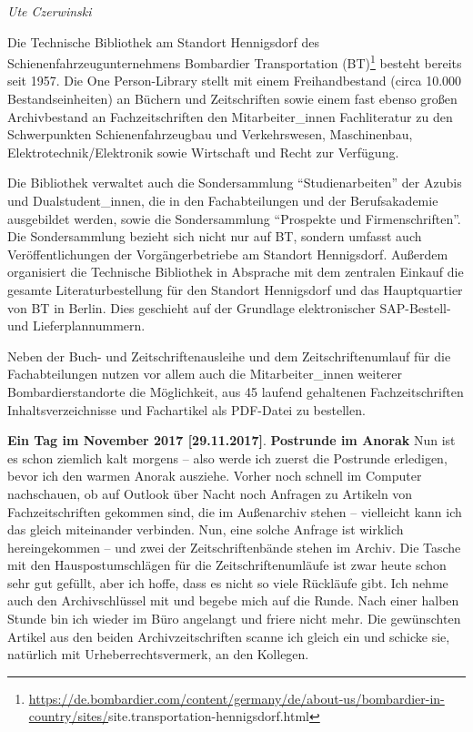 \documentclass[a4paper,
fontsize=11pt,
oneside,
numbers=noperiodatend,
parskip=half-,
bibliography=totoc,
final
]{scrartcl}
\begin{document}
\textit{Ute Czerwinski}

Die Technische Bibliothek am Standort Hennigsdorf des
Schienenfahrzeugunternehmens Bombardier Transportation (BT)\footnote{\url{https://de.bombardier.com/content/germany/de/about-us/bombardier-in-country/sites/}site.transportation-hennigsdorf.html}
besteht bereits seit 1957. Die One Person-Library stellt mit einem
Freihandbestand (circa 10.000 Bestandseinheiten) an Büchern und
Zeitschriften sowie einem fast ebenso großen Archivbestand an
Fachzeitschriften den Mitarbeiter\_innen Fachliteratur zu den
Schwerpunkten Schienenfahrzeugbau und Verkehrswesen, Maschinenbau,
Elektrotechnik/Elektronik sowie Wirtschaft und Recht zur Verfügung.

Die Bibliothek verwaltet auch die Sondersammlung
\enquote{Studienarbeiten} der Azubis und Dualstudent\_innen, die in den
Fachabteilungen und der Berufsakademie ausgebildet werden, sowie die
Sondersammlung \enquote{Prospekte und Firmenschriften}. Die
Sondersammlung bezieht sich nicht nur auf BT, sondern umfasst auch
Veröffentlichungen der Vorgängerbetriebe am Standort Hennigsdorf.
Außerdem organisiert die Technische Bibliothek in Absprache mit dem
zentralen Einkauf die gesamte Literaturbestellung für den Standort
Hennigsdorf und das Hauptquartier von BT in Berlin. Dies geschieht auf
der Grundlage elektronischer SAP-Bestell- und Lieferplannummern.

Neben der Buch- und Zeitschriftenausleihe und dem Zeitschriftenumlauf
für die Fachabteilungen nutzen vor allem auch die Mitarbeiter\_innen
weiterer Bombardierstandorte die Möglichkeit, aus 45 laufend gehaltenen
Fachzeitschriften Inhaltsverzeichnisse und Fachartikel als PDF-Datei zu
bestellen.

\textbf{Ein Tag im November 2017 {[}29.11.2017{]}}. \textbf{Postrunde im
Anorak} Nun ist es schon ziemlich kalt morgens -- also werde ich zuerst
die Postrunde erledigen, bevor ich den warmen Anorak ausziehe. Vorher
noch schnell im Computer nachschauen, ob auf Outlook über Nacht noch
Anfragen zu Artikeln von Fachzeitschriften gekommen sind, die im
Außenarchiv stehen -- vielleicht kann ich das gleich miteinander
verbinden. Nun, eine solche Anfrage ist wirklich hereingekommen -- und
zwei der Zeitschriftenbände stehen im Archiv. Die Tasche mit den
Hauspostumschlägen für die Zeitschriftenumläufe ist zwar heute schon
sehr gut gefüllt, aber ich hoffe, dass es nicht so viele Rückläufe gibt.
Ich nehme auch den Archivschlüssel mit und begebe mich auf die Runde.
Nach einer halben Stunde bin ich wieder im Büro angelangt und friere
nicht mehr. Die gewünschten Artikel aus den beiden Archivzeitschriften
scanne ich gleich ein und schicke sie, natürlich mit
Urheberrechtsvermerk, an den Kollegen.
\end{document}
